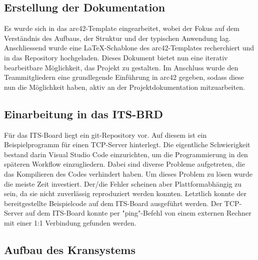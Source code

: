 \documentclass{article}
\begin{document}
\subsection{Erstellung der Dokumentation}
Es wurde sich in das arc42-Template eingearbeitet, wobei der Fokus auf dem Verständnis des Aufbaus, der Struktur und der typischen Anwendung lag. Anschliessend wurde eine LaTeX-Schablone des arc42-Templates recherchiert und in das Repository hochgeladen. Dieses Dokument bietet nun eine iterativ bearbeitbare Möglichkeit, das Projekt zu gestalten.
Im Anschluss wurde den Teammitgliedern eine grundlegende Einführung in arc42 gegeben, sodass diese nun die Möglichkeit haben, aktiv an der Projektdokumentation mitzuarbeiten.

\subsection{Einarbeitung in das ITS-BRD}
Für das ITS-Board liegt ein git-Repository vor. Auf diesem ist ein Beispielprogramm für einen TCP-Server hinterlegt. Die eigentliche Schwierigkeit bestand darin Visual Studio Code einzurichten, um die Programmierung in den späteren Workflow einzugliedern. Dabei sind diverse Probleme aufgetreten, die das Kompilieren des Codes verhindert haben. Um dieses Problem zu lösen wurde die meiste Zeit investiert. Der/die Fehler scheinen aber Plattformabhängig zu sein, da sie nicht zuverlässig reproduziert werden konnten. Letztlich konnte der bereitgestellte Beispielcode auf dem ITS-Board ausgeführt werden. Der TCP-Server auf dem ITS-Board konnte per "ping"-Befehl von einem externen Rechner mit einer 1:1 Verbindung gefunden werden.
\subsection{Aufbau des Kransystems}
\end{document}
